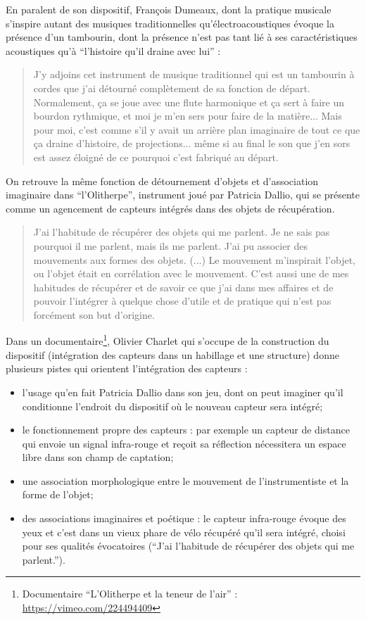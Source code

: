 En paralent de son dispositif, François Dumeaux, dont la pratique musicale s'inspire autant des musiques traditionnelles qu'électroacoustiques évoque la présence d'un tambourin, dont la présence n'est pas tant lié à ses caractéristiques acoustiques qu'à ``l'histoire qu'il draine avec lui'' :
\begin{quotation}
	J'y adjoins cet instrument de musique traditionnel qui est un tambourin à cordes que j'ai détourné complètement de sa fonction de départ. Normalement, ça se joue avec une flute harmonique et ça sert à faire un bourdon rythmique, et moi je m'en sers pour faire de la matière... Mais pour moi, c'est comme s'il y avait un arrière plan imaginaire de tout ce que ça draine d'histoire, de projections... même si au final le son que j'en sors est assez éloigné de ce pourquoi c'est fabriqué au départ.
\end{quotation}

On retrouve la même fonction de détournement d'objets et d'association imaginaire dans ``l'Olitherpe'', instrument joué par Patricia Dallio, qui se présente comme un agencement de capteurs intégrés dans des objets de récupération. 

\begin{quotation}
	J'ai l'habitude de récupérer des objets qui me parlent. Je ne sais pas pourquoi il me parlent, mais ils me parlent. J'ai pu associer des mouvements aux formes des objets. (...) Le mouvement m'inspirait l'objet, ou l'objet était en corrélation avec le mouvement. C'est aussi une de mes habitudes de récupérer et de savoir ce que j'ai dans mes affaires et de pouvoir l'intégrer à quelque chose d'utile et de pratique qui n'est pas forcément son but d'origine.
\end{quotation}

Dans un documentaire\footnote{Documentaire ``L'Olitherpe et la teneur de l'air'' : \url{https://vimeo.com/224494409}}, Olivier Charlet qui s'occupe de la construction du dispositif (intégration des capteurs dans un habillage et une structure) donne plusieurs pistes qui orientent l'intégration des capteurs : 
\vspace{-1em}
\begin{itemize}[noitemsep]
\item l'usage qu'en fait Patricia Dallio dans son jeu, dont on peut imaginer qu'il conditionne l'endroit du dispositif où le nouveau capteur sera intégré; 
\item le fonctionnement propre des capteurs : par exemple un capteur de distance qui envoie un signal infra-rouge et reçoit sa réflection nécessitera un espace libre dans son champ de captation;
\item une association morphologique entre le mouvement de l'instrumentiste et la forme de l'objet;
\item des associations imaginaires et poétique : le capteur infra-rouge évoque des yeux et c'est dans un vieux phare de vélo récupéré qu'il sera intégré, choisi pour ses qualités évocatoires (``J'ai l'habitude de récupérer des objets qui me parlent.'').
\end{itemize}

